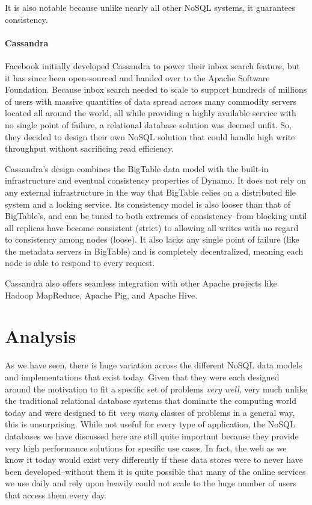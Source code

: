 \documentclass[11pt,a4paper]{report}
\begin{document}
It is also notable because unlike nearly all other NoSQL systems, it guarantees consistency.
\cite{chang2008bigtable}

\paragraph{Cassandra}
Facebook initially developed Cassandra to power their inbox search feature, but it has since been open-sourced and handed over to the Apache Software Foundation.\cite{lakshman2010cassandra,featherston2010cassandra} Because inbox search needed to scale to support hundreds of millions of users with massive quantities of data spread across many commodity servers located all around the world, all while providing a highly available service with no single point of failure, a relational database solution was deemed unfit. So, they decided to design their own NoSQL solution that could handle high write throughput without sacrificing read efficiency.\cite{lakshman2010cassandra}

Cassandra's design combines the BigTable data model with the built-in infrastructure and eventual consistency properties of Dynamo.\cite{featherston2010cassandra} It does not rely on any external infrastructure in the way that BigTable relies on a distributed file system and a locking service. Its consistency model is also looser than that of BigTable's, and can be tuned to both extremes of consistency--from blocking until all replicas have become consistent (strict) to allowing all writes with no regard to consistency among nodes (loose). It also lacks any single point of failure (like the metadata servers in BigTable) and is completely decentralized, meaning each node is able to respond to every request.

Cassandra also offers seamless integration with other Apache projects like Hadoop MapReduce, Apache Pig, and Apache Hive.


\section{Analysis}
As we have seen, there is huge variation across the different NoSQL data models and implementations that exist today. Given that they were each designed around the motivation to fit a specific set of problems \textit{very well}, very much unlike the traditional relational database systems that dominate the computing world today and were designed to fit \textit{very many} classes of problems in a general way, this is unsurprising. While not useful for every type of application, the NoSQL databases we have discussed here are still quite important because they provide very high performance solutions for specific use cases. In fact, the web as we know it today would exist very differently if these data stores were to never have been developed--without them it is quite possible that many of the online services we use daily and rely upon heavily could not scale to the huge number of users that access them every day. 
\end{document}
